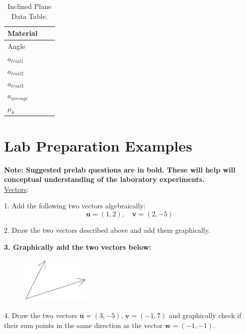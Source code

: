 
\begin{table}
\begin{center}
\begin{tabular}{|l |p{5 cm}| p{5 cm} |}
\hline
	Material &  \\
	\hline
	Angle& \\
	\hline
	$a_{trial 1}$& \\
	\hline
	$a_{trail 2}$& \\
	\hline
	$a_{trial 3}$& \\
	\hline
	$a_{average}$& \\
	\hline
	$\mu_k$& \\
	\hline
\end{tabular}
\end{center}
\caption{Inclined Plane Data Table.}
\label{planedatatable}
\end{table}

\section{Lab Preparation Examples}
{\bf{Note: Suggested prelab questions are in bold. These will help will conceptual understanding of the laboratory experiments.}}
\\
\noindent \underline{Vectors}:\myskip

1. Add the following two vectors algebraically:
\begin{equation*}
    \mathbf{u} = (1,2),\quad \mathbf{v} = (2,-5)
\end{equation*}

2. Draw the two vectors described above and add them graphically. \myskip

{\bf{3. Graphically add the two vectors below:}}
\begin{figure}[h]
    \begin{center}
        \includegraphics[width=0.3\textwidth]{./Exp1-4/pic/image4.png}
    \end{center}
\end{figure}

4. Draw the two vectors $\mathbf{u} = (3,-5)$, $\mathbf{v} = (-1,7)$ and graphically check if their sum points in the same direction as the vector $\mathbf{w} = (-1,-1)$.\myskip

